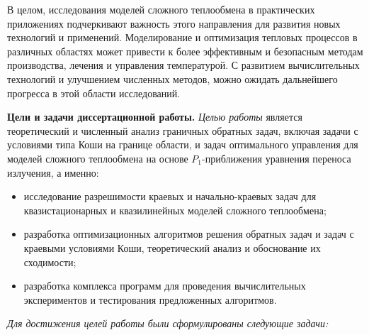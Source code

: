В целом, исследования моделей сложного теплообмена в практических приложениях
подчеркивают важность этого направления для развития новых технологий и применений.
Моделирование и оптимизация тепловых процессов в различных областях может привести
к более эффективным и безопасным методам производства, лечения и управления температурой.
С развитием вычислительных технологий и улучшением численных методов, можно ожидать
дальнейшего прогресса в этой области исследований.


\textbf{Цели и задачи диссертационной работы.}
\textit{Целью работы} является теоретический и численный анализ граничных
обратных задач, включая задачи с условиями типа Коши на границе области,
и задач оптимального управления для моделей сложного теплообмена на
основе $P_1$-приближения уравнения переноса излучения, а именно:
\begin{itemize}[leftmargin=5.5mm]\renewcommand\labelitemi{--}
  \item исследование разрешимости краевых и начально-краевых задач для
квазистационарных и квазилинейных моделей сложного теплообмена;
  \item разработка оптимизационных алгоритмов решения обратных задач и задач
с краевыми условиями Коши, теоретический анализ и обоснование их
сходимости;
  \item разработка комплекса программ для проведения вычислительных
экспериментов и тестирования предложенных алгоритмов.
\end{itemize}

\textit{Для достижения целей работы были сформулированы следующие задачи:}

